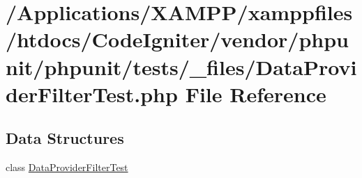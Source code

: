 \hypertarget{_data_provider_filter_test_8php}{}\section{/\+Applications/\+X\+A\+M\+P\+P/xamppfiles/htdocs/\+Code\+Igniter/vendor/phpunit/phpunit/tests/\+\_\+files/\+Data\+Provider\+Filter\+Test.php File Reference}
\label{_data_provider_filter_test_8php}
\subsection*{Data Structures}
\begin{DoxyCompactItemize}
\item 
class \mbox{\hyperlink{class_data_provider_filter_test}{Data\+Provider\+Filter\+Test}}
\end{DoxyCompactItemize}
